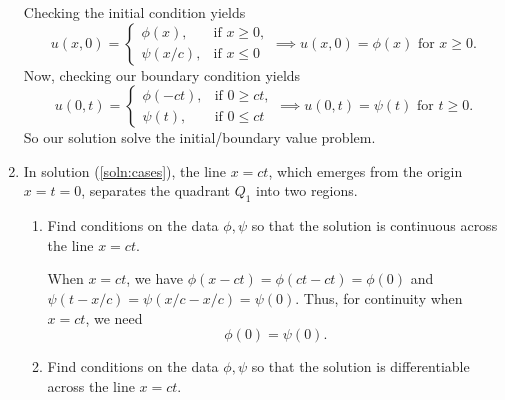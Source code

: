 \documentclass[a4paper,12pt]{article}
\begin{document}
\begin{enumerate}[label = \textbf{(\alph*)}]
        Checking the initial condition yields
        \[
            u(x, 0) = 
            \begin{cases}
                \phi(x), & \text{if } x \geq 0, \\
                \psi(x/c), & \text{if } x \leq 0
            \end{cases} \implies
            u(x,0) = \phi(x) \text{ for } x \geq 0.
        \]
        Now, checking our boundary condition yields
        \[
            u(0, t) = 
            \begin{cases}
                \phi(- ct), & \text{if } 0 \geq ct, \\
                \psi(t), & \text{if } 0 \leq ct
            \end{cases} \implies
            u(0, t) = \psi(t) \text{ for } t \geq 0.
        \]
        So our solution solve the initial/boundary value problem.
        
        \item In solution (\ref{soln:cases}), the line $ x = ct $, which emerges from the origin $ x = t = 0 $, separates the quadrant $ Q_1 $ into two regions.
        \begin{enumerate}[label = \textbf{(\roman*)}]
            \item Find conditions on the data $ \phi, \psi $ so that the solution is continuous across the line $ x = ct $.
            
            When $ x = ct $, we have $ \phi(x - ct) = \phi(ct - ct) = \phi(0) $ and $ \psi(t - x/c) = \psi(x/c - x/c) = \psi(0)$. Thus, for continuity when $ x = ct $, we need
            \[
                \phi(0) = \psi(0).
            \]
            
            \item Find conditions on the data $ \phi, \psi $ so that the solution is differentiable across the line $ x = ct $.
            

\end{enumerate}
\end{enumerate}
\end{document}
